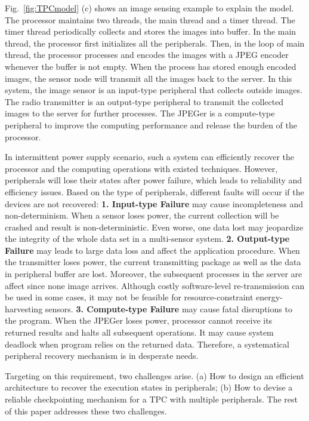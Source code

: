 Fig.~\ref{fig:TPCmodel} (c) shows an image sensing example to explain the model.
The processor maintains two threads, the main thread and a timer thread. 
The timer thread periodically collects and stores the images into buffer.
In the main thread, the processor first initializes all the peripherals.
Then, in the loop of main thread, the processor processes and encodes the images with a JPEG encoder whenever the buffer is not empty.
When the process has stored enough encoded images, the sensor node will transmit all the images back to the server.
In this system, the image sensor is an input-type peripheral that collects outside images.
The radio transmitter is an output-type peripheral to transmit the collected images to the server for further processes.
The JPEGer is a compute-type peripheral to improve the computing performance and release the burden of the processor.

%
In intermittent power supply scenario, such a system can efficiently recover the processor and the computing operations with existed techniques. 
However, peripherals will lose their states after power failure, which leads to reliability and efficiency issues. 
Based on the type of peripherals, different faults will occur if the devices are not recovered: 
\textbf{1. Input-type Failure} may cause incompleteness and non-determinism. When a sensor loses power, the current collection will be crashed and result is non-deterministic. Even worse, one data lost may jeopardize the integrity of the whole data set in a multi-sensor system.
\textbf{2. Output-type Failure} may leads to large data loss and affect the application procedure. When the transmitter loses power, the current transmitting package as well as the data in peripheral buffer are lost. Moreover, the subsequent processes in the server are affect since none image arrives. Although costly software-level re-transmission can be used in some cases, it may not be feasible for resource-constraint energy-harvesting sensors. 
\textbf{3. Compute-type Failure} may cause fatal disruptions to the program. When the JPEGer loses power, processor cannot receive its returned results and halts all subsequent operations. It may cause system deadlock when program relies on the returned data.
Therefore, a systematical peripheral recovery mechanism is in desperate needs. 

Targeting on this requirement, two challenges arise.
(a) How to design an efficient architecture to recover the execution states in peripherals;
(b) How to devise a reliable checkpointing mechanism for a TPC with multiple peripherals.
The rest of this paper addresses these two challenges.

